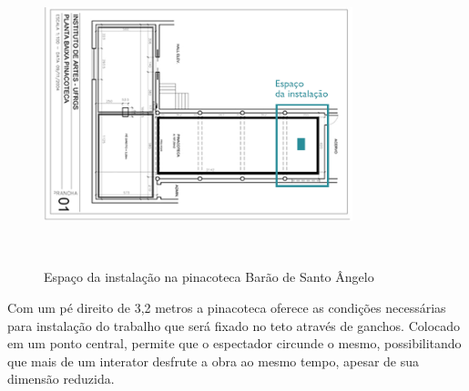 \begin{figure}[H]
  \begin{center}
    \caption{Espaço da instalação na pinacoteca Barão de Santo Ângelo}
    \vspace*{0,2cm}
    \includegraphics[width=0.8\textwidth]{./04-figuras/pinacoteca}
    \label{fig:pinacoteca}
  \end{center}
  \vspace*{-0,9cm}
  \\
\end{figure}

Com um pé direito de 3,2 metros a pinacoteca oferece as condições necessárias para instalação do trabalho que será fixado no teto através de ganchos. Colocado em um ponto central, permite que o espectador circunde o mesmo, possibilitando que mais de um interator desfrute a obra ao mesmo tempo, apesar de sua dimensão reduzida.

